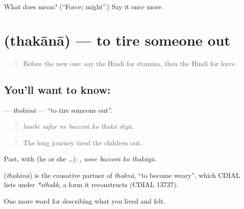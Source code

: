 \begin{tcolorbox}[breakable,colback=teal!4,colframe=teal!35!black,title={Before you move on}]
What does  mean? (\textquotedblleft{}Force; might\textquotedblright{}.) Say it once more.
\end{tcolorbox}
\section[\texorpdfstring{\hi{थकाना} (thakānā)}{थकाना (thakānā)}]{ (thakānā) — to tire someone out}

\label{lesson:HI-C483-thakana}



\begin{quote}
Before the new one: say the Hindi for stamina, then the Hindi for force.
\end{quote}

\subsection*{You'll want to know: }
\textbf{} — \emph{thakānā} — \textquotedblleft{}to tire someone out\textquotedblright{}.

\begin{quote}
      
\end{quote}

\begin{quote}
\emph{lambe safar ne baccoṁ ko thakā diyā.}
\end{quote}

\begin{quote}
The long journey tired the children out.
\end{quote}

Past, with  (he or she …):    , \emph{usne baccoṁ ko thakāyā}.

\begin{cousinweb}
\textbf{} (\emph{thakānā}) is the causative partner of \emph{thaknā}, \textquotedblleft{}to become weary\textquotedblright{}, which CDIAL lists under \emph{*sthakk}, a form it reconstructs (CDIAL 13737).
\end{cousinweb}

\begin{grammarlens}[title={What you've built}]
One more word for describing what you lived and felt.
\end{grammarlens}

